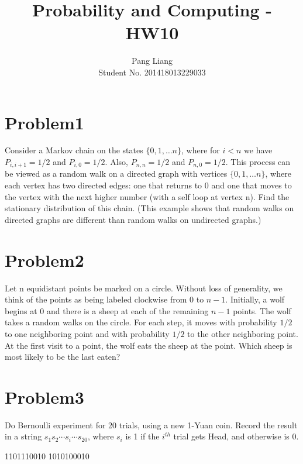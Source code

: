 \documentclass[12pt]{article}
\title{Probability and Computing - HW10}
\author{Pang Liang\\ Student No. 201418013229033}
\begin{document}
\maketitle

\section{Problem1}
Consider a Markov chain on the states $\{ 0,1,\dots n\}$, where for $i < n$ we have $P_{i,i+1} = 1/2$ and $P_{i,0} = 1/2$. Also, $P_{n,n} = 1/2$ and $P_{n,0} = 1/2$. This process can be viewed as a random walk on a directed graph with vertices $\{0, 1,\dots n \}$, where each vertex has two directed edges: one that returns to 0 and one that moves to the vertex with the next higher number (with a self loop at vertex n). Find the stationary distribution of this chain. (This example shows that random walks on directed graphs are different than random walks on undirected graphs.)

\section{Problem2}
Let n equidistant points be marked on a circle. Without loss of generality, we think of the points as being labeled clockwise from 0 to $n - 1$. Initially, a wolf begins at 0 and there is a sheep at each of the remaining $n - 1$ points. The wolf takes a random walks on the circle. For each step, it moves with probability $1/2$ to one neighboring point and with probability $1/2$ to the other neighboring point. At the first visit to a point, the wolf eats the sheep at the point. Which sheep is most likely to be the last eaten?

\section{Problem3}
Do Bernoulli experiment for 20 trials, using a new 1-Yuan coin. Record the result in a
string $s_1s_2 \cdots s_i \cdots s_{20}$, where $s_i$ is 1 if the $i^{th}$ trial gets Head, and otherwise is 0.

1101110010 1010100010
\end{document}
